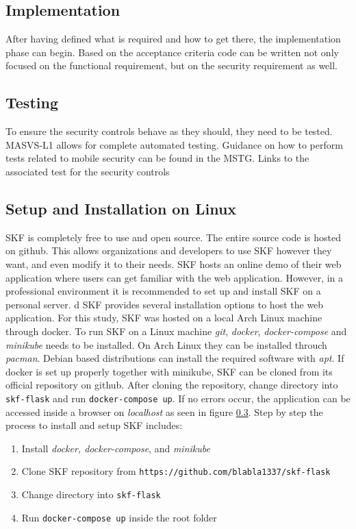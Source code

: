 \subsection{Implementation}
After having defined what is required and how to get there, the implementation phase can begin. Based on the acceptance criteria code can be written not only focused on the functional requirement, but on the security requirement as well.

\subsection{Testing}
To ensure the security controls behave as they should, they need to be tested. MASVS-L1 allows for complete automated testing. Guidance on how to perform tests related to mobile security can be found in the MSTG. Links to the associated test for the security controls

\subsection{Setup and Installation on Linux}
SKF is completely free to use and open source. The entire source code is hosted on github. This allows organizations and developers to use SKF however they want, and even modify it to their needs. SKF hosts an online demo of their web application where users can get familiar with the web application. However, in a professional environment it is recommended to set up and install SKF on a personal server. 
d
SKF provides several installation options to host the web application. For this study, SKF was hosted on a local Arch Linux machine through docker. To run SKF on a Linux machine \textit{git}, \textit{docker}, \textit{docker-compose} and \textit{minikube} needs to be installed. On Arch Linux they can be installed throuch \textit{pacman}. Debian based distributions can install the required software with \textit{apt}. If docker is set up properly together with minikube, SKF can be cloned from its official repository on github. After cloning the repository, change directory into \verb|skf-flask| and run \verb|docker-compose up|. If no errors occur, the application can be accessed inside a browser on \textit{localhost} as seen in figure \ref{}. Step by step the process to install and setup SKF includes:

\begin{enumerate}
    \item Install \textit{docker, docker-compose}, and \textit{minikube}
    \item Clone SKF repository from \verb|https://github.com/blabla1337/skf-flask|
    \item Change directory into \verb|skf-flask|
    \item Run \verb|docker-compose up| inside the root folder
\end{enumerate}

